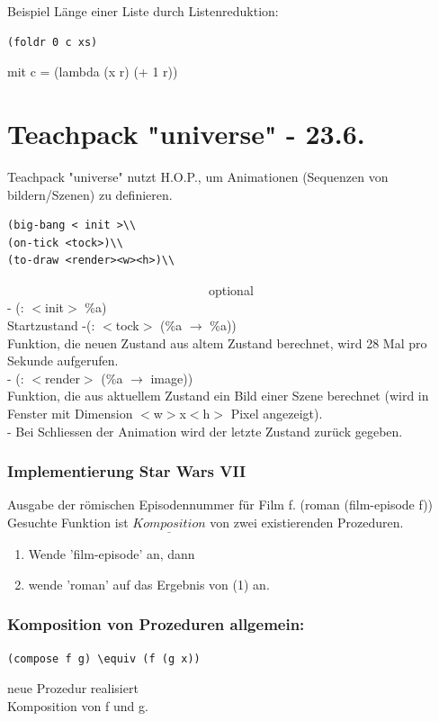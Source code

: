 \documentclass[a4paper, 20pt, openany]{book}
\begin{document}
Beispiel Länge einer Liste durch Listenreduktion:

\begin{lstlisting}
(foldr 0 c xs)
\end{lstlisting}

mit c = (lambda (x r) (+ 1 r))

\chapter{Teachpack "universe" - 23.6.}
Teachpack "universe" nutzt H.O.P., um Animationen (Sequenzen von bildern/Szenen) zu definieren.\\
\begin{lstlisting}
(big-bang < init >\\
(on-tick <tock>)\\
(to-draw <render><w><h>)\\
\end{lstlisting}

 \ \ \ \ \ \ \ \  \ \ \ \ \ \ \ \  \ \ \ \ \ \ \ \  \ \ \ \ \ \ \ \ optional\\
 
 - (: $<$init$>$ \%a)\\
 Startzustand\/
 -(: $<$tock$>$ (\%a $\rightarrow$ \%a))\\
 Funktion, die neuen Zustand aus altem Zustand berechnet, wird 28 Mal pro Sekunde aufgerufen.\\
 - (: $<$render$>$ (\%a $\rightarrow$ image))\\
 Funktion, die aus aktuellem Zustand ein Bild einer Szene berechnet (wird in Fenster mit Dimension $<$w$>$x$<$h$>$ Pixel angezeigt).\\
 - Bei Schliessen der Animation wird der letzte Zustand zurück gegeben.

\subsection{Implementierung Star Wars VII}
Ausgabe der römischen Episodennummer für Film f.
(roman (film-episode f))\\
Gesuchte Funktion ist $\underline{Komposition}$ von zwei existierenden Prozeduren.
\begin{enumerate}
\item Wende 'film-episode' an, dann
\item wende 'roman' auf das Ergebnis von (1) an.
\end{enumerate}
\subsection{Komposition von Prozeduren allgemein:}
\begin{lstlisting}
(compose f g) \equiv (f (g x))
\end{lstlisting}
neue Prozedur realisiert\\
Komposition von f und g.
\end{document}
